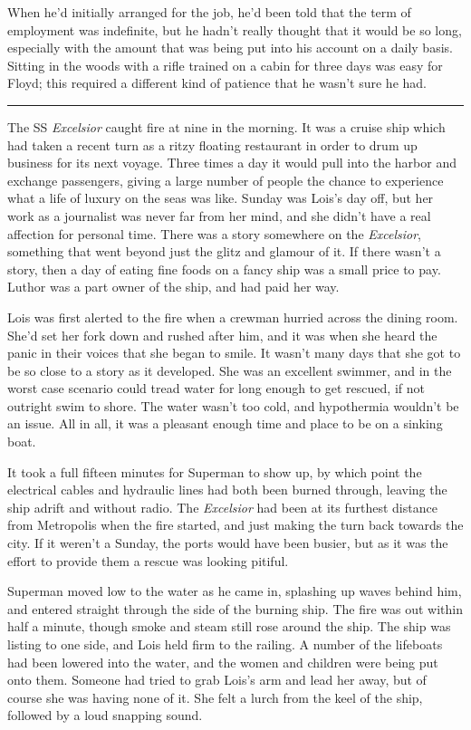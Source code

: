 \documentclass[ebook,12pt]{memoir}
\begin{document}
When he'd initially arranged for the job, he'd been told that the term
of employment was indefinite, but he hadn't really thought that it would
be so long, especially with the amount that was being put into his
account on a daily basis. Sitting in the woods with a rifle trained on a
cabin for three days was easy for Floyd; this required a different kind
of patience that he wasn't sure he had.

\begin{center}\rule{0.5\linewidth}{0.5pt}\end{center}

The SS \emph{Excelsior} caught fire at nine in the morning. It was a
cruise ship which had taken a recent turn as a ritzy floating restaurant
in order to drum up business for its next voyage. Three times a day it
would pull into the harbor and exchange passengers, giving a large
number of people the chance to experience what a life of luxury on the
seas was like. Sunday was Lois's day off, but her work as a journalist
was never far from her mind, and she didn't have a real affection for
personal time. There was a story somewhere on the \emph{Excelsior},
something that went beyond just the glitz and glamour of it. If there
wasn't a story, then a day of eating fine foods on a fancy ship was a
small price to pay. Luthor was a part owner of the ship, and had paid
her way.

Lois was first alerted to the fire when a crewman hurried across the
dining room. She'd set her fork down and rushed after him, and it was
when she heard the panic in their voices that she began to smile. It
wasn't many days that she got to be so close to a story as it developed.
She was an excellent swimmer, and in the worst case scenario could tread
water for long enough to get rescued, if not outright swim to shore. The
water wasn't too cold, and hypothermia wouldn't be an issue. All in all,
it was a pleasant enough time and place to be on a sinking boat.

It took a full fifteen minutes for Superman to show up, by which point
the electrical cables and hydraulic lines had both been burned through,
leaving the ship adrift and without radio. The \emph{Excelsior} had been
at its furthest distance from Metropolis when the fire started, and just
making the turn back towards the city. If it weren't a Sunday, the ports
would have been busier, but as it was the effort to provide them a
rescue was looking pitiful.

Superman moved low to the water as he came in, splashing up waves behind
him, and entered straight through the side of the burning ship. The fire
was out within half a minute, though smoke and steam still rose around
the ship. The ship was listing to one side, and Lois held firm to the
railing. A number of the lifeboats had been lowered into the water, and
the women and children were being put onto them. Someone had tried to
grab Lois's arm and lead her away, but of course she was having none of
it. She felt a lurch from the keel of the ship, followed by a loud
snapping sound.
\end{document}
